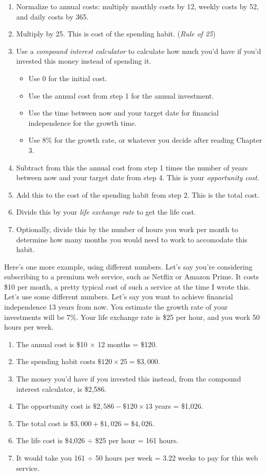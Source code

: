 \begin{enumerate}
\item Normalize to annual costs: multiply monthly costs by 12, weekly costs by 52, and daily costs by 365.
\item Multiply by 25. This is cost of the spending habit. (\emph{Rule of 25})
\item Use a \emph{compound interest calculator} to calculate how much you'd have if you'd invested this money instead of spending it.
\begin{itemize}
\item Use 0 for the initial cost.
\item Use the annual cost from step 1 for the annual investment.
\item Use the time between now and your target date for financial independence for the growth time.
\item Use 8\% for the growth rate, or whatever you decide after reading Chapter 3.
\end{itemize}
\item Subtract from this the annual cost from step 1 times the number of years between now and your target date from step 4. This is your \emph{opportunity cost.}
\item Add this to the cost of the spending habit from step 2. This is the total cost.
\item Divide this by your \emph{life exchange rate} to get the life cost.
\item Optionally, divide this by the number of hours you work per month to determine how many months you would need to work to accomodate this habit.
\end{enumerate}

Here's one more example, using different numbers. Let's say you're considering subscribing to a premium web service, such as Netflix or Amazon Prime. It costs \$10 per month, a pretty typical cost of such a service at the time I wrote this. Let's use some different numbers. Let's say you want to achieve financial independence 13 years from now. You estimate the growth rate of your investments will be 7\%. Your life exchange rate is \$25 per hour, and you work 50 hours per week.

\begin{enumerate}
\item The annual cost is \$10 $\times$ 12 months = \$120.
\item The spending habit costs $\$120 \times 25 = \$3,000$.
\item The money you'd have if you invested this instead, from the compound interest calculator, is \$2,586.
\item The opportunity cost is $\$2,586 - \$120 \times 13$ years = \$1,026.
\item The total cost is $\$3,000 + \$1,026 = \$4,026$.
\item The life cost is \$4,026 $\div$ \$25 per hour = 161 hours.
\item It would take you 161 $\div$ 50 hours per week = 3.22 weeks to pay for this web service.
\end{enumerate}

